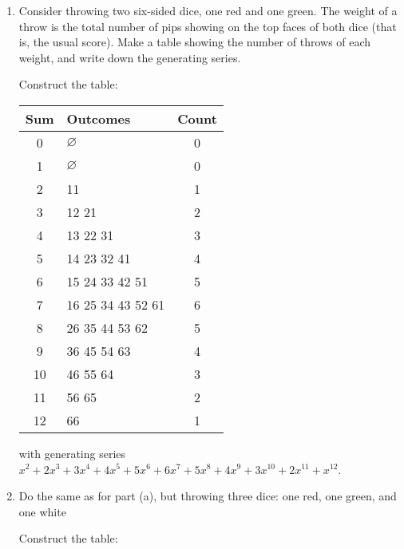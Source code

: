 \documentclass[class=math239,notes]{agony}
\begin{document}
\begin{xca}\label{xca:2-dice}\end{xca}
\begin{enumerate}
  \item Consider throwing two six-sided dice, one red and one green.
        The weight of a throw is the total number of pips showing on
        the top faces of both dice (that is, the usual score).
        Make a table showing the number of throws of each weight,
        and write down the generating series.
        \begin{sol}
          Construct the table:
          \begin{center}
            \begin{tabular}{c|l|c}
              Sum & Outcomes          & Count \\ \hline
              0   & $\varnothing$     & 0     \\
              1   & $\varnothing$     & 0     \\
              2   & 11                & 1     \\
              3   & 12 21             & 2     \\
              4   & 13 22 31          & 3     \\
              5   & 14 23 32 41       & 4     \\
              6   & 15 24 33 42 51    & 5     \\
              7   & 16 25 34 43 52 61 & 6     \\
              8   & 26 35 44 53 62    & 5     \\
              9   & 36 45 54 63       & 4     \\
              10  & 46 55 64          & 3     \\
              11  & 56 65             & 2     \\
              12  & 66                & 1
            \end{tabular}
          \end{center}
          with generating series $x^2+2x^3+3x^4+4x^5+5x^6+6x^7+5x^8+4x^9+3x^{10}+2x^{11}+x^{12}$.
        \end{sol}
  \item Do the same as for part (a), but throwing three dice:
        one red, one green, and one white
        \begin{sol}
          Construct the table:
          \begin{center}
            \tiny\begin{tabular}{c|l|c}

\end{tabular}
\end{center}
\end{sol}
\end{enumerate}
\end{document}
